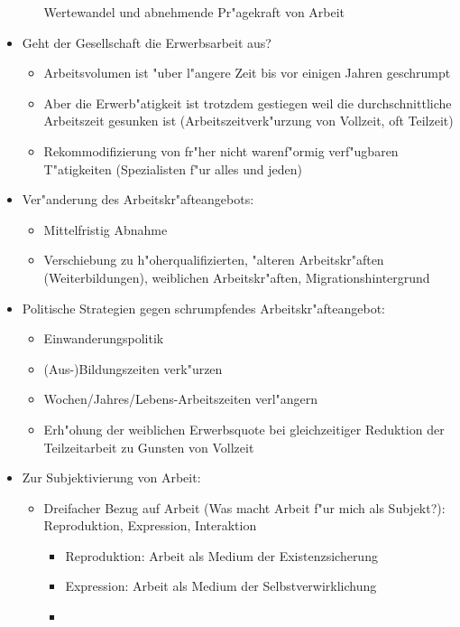\begin{itemize}
\begin{itemize}
				Wertewandel und abnehmende Pr"agekraft von Arbeit
		\end{itemize}
	\item
		Geht der Gesellschaft die Erwerbsarbeit aus?
		\begin{itemize}
			\item
				Arbeitsvolumen ist "uber l"angere Zeit bis vor einigen Jahren geschrumpt
			\item
				Aber die Erwerb"atigkeit ist trotzdem gestiegen weil die durchschnittliche Arbeitszeit gesunken ist (Arbeitszeitverk"urzung von Vollzeit, oft Teilzeit)
			\item
				Rekommodifizierung von fr"her nicht warenf"ormig verf"ugbaren T"atigkeiten (Spezialisten f"ur alles und jeden)
		\end{itemize}

	\item
		Ver"anderung des Arbeitskr"afteangebots:
		\begin{itemize}
			\item
				Mittelfristig Abnahme
			\item
				Verschiebung zu h"oherqualifizierten, "alteren Arbeitskr"aften (Weiterbildungen), weiblichen Arbeitskr"aften, Migrationshintergrund
		\end{itemize}
	\item
		Politische Strategien gegen schrumpfendes Arbeitskr"afteangebot:
		\begin{itemize}
			\item
				Einwanderungspolitik
			\item
				(Aus-)Bildungszeiten verk"urzen
			\item
				Wochen/Jahres/Lebens-Arbeitszeiten verl"angern
			\item
				Erh"ohung der weiblichen Erwerbsquote bei gleichzeitiger Reduktion der Teilzeitarbeit zu Gunsten von Vollzeit
		\end{itemize}
	\item
		Zur Subjektivierung von Arbeit:
		\begin{itemize}
			\item
				Dreifacher Bezug auf Arbeit (Was macht Arbeit f"ur mich als Subjekt?): Reproduktion, Expression, Interaktion
				\begin{itemize}
					\item
						Reproduktion: Arbeit als Medium der Existenzsicherung
					\item
						Expression: Arbeit als Medium der Selbstverwirklichung
					\item

\end{itemize}
\end{itemize}
\end{itemize}
